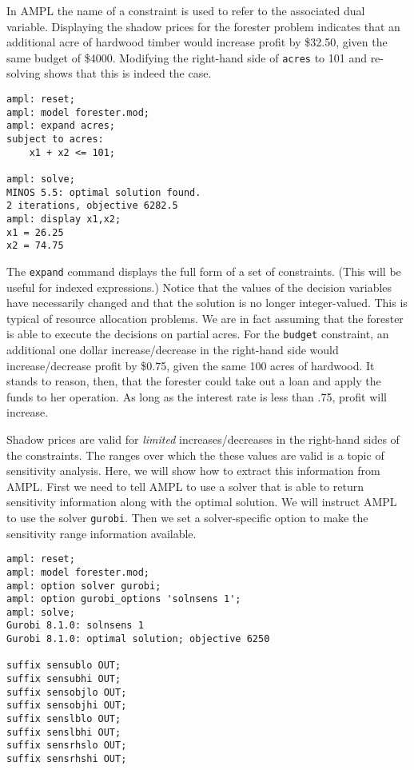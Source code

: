 \documentclass[12pt]{book}
\begin{document}
In AMPL the name of a constraint is used to refer to the associated
dual variable. Displaying the shadow prices for the forester problem
indicates that an additional acre of hardwood timber would increase
profit by \$32.50, given the same budget of \$4000.  Modifying the
right-hand side of \texttt{acres} to 101 and re-solving shows that
this is indeed the case.

\begin{Verbatim}[samepage=true]
ampl: reset;
ampl: model forester.mod;
ampl: expand acres;
subject to acres:
	x1 + x2 <= 101;

ampl: solve;
MINOS 5.5: optimal solution found.
2 iterations, objective 6282.5
ampl: display x1,x2;
x1 = 26.25
x2 = 74.75
\end{Verbatim}

The \texttt{expand} command displays the full form of a set of
constraints.  (This will be useful for indexed expressions.) Notice
that the values of the decision variables have necessarily changed and
that the solution is no longer integer-valued.  This is typical of
resource allocation problems. We are in fact assuming that the
forester is able to execute the decisions on partial acres.  For the
\texttt{budget} constraint, an additional one dollar increase/decrease
in the right-hand side would increase/decrease profit by \$0.75, given
the same 100 acres of hardwood. It stands to reason, then, that the
forester could take out a loan and apply the funds to her
operation. As long as the interest rate is less than .75, profit will
increase.

Shadow prices are valid for \emph{limited} increases/decreases in the
right-hand sides of the constraints. The ranges over which the these
values are valid is a topic of sensitivity analysis. Here, we will
show how to extract this information from AMPL. First we need to tell
AMPL to use a solver that is able to return sensitivity information
along with the optimal solution. We will instruct AMPL to use the solver
\texttt{gurobi}. Then we set a solver-specific option to make the
sensitivity range information available.

\begin{Verbatim}[samepage=true]
ampl: reset;
ampl: model forester.mod;
ampl: option solver gurobi;
ampl: option gurobi_options 'solnsens 1'; 
ampl: solve;
Gurobi 8.1.0: solnsens 1
Gurobi 8.1.0: optimal solution; objective 6250

suffix sensublo OUT;
suffix sensubhi OUT;
suffix sensobjlo OUT;
suffix sensobjhi OUT;
suffix senslblo OUT;
suffix senslbhi OUT;
suffix sensrhslo OUT;
suffix sensrhshi OUT;
\end{Verbatim}
\end{document}
